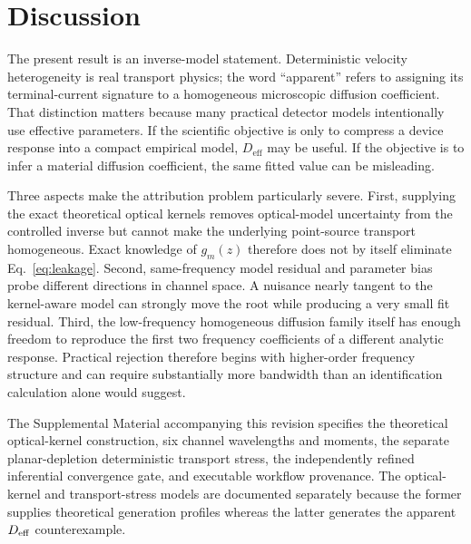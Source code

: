 \documentclass[aps,pra,twocolumn,superscriptaddress,nofootinbib]{revtex4-2}
\newcommand{\Deff}{D_{\mathrm{eff}}}
\begin{document}
\section{Discussion}

The present result is an inverse-model statement. Deterministic velocity heterogeneity is real transport physics; the word ``apparent'' refers to assigning its terminal-current signature to a homogeneous microscopic diffusion coefficient. That distinction matters because many practical detector models intentionally use effective parameters. If the scientific objective is only to compress a device response into a compact empirical model, $\Deff$ may be useful. If the objective is to infer a material diffusion coefficient, the same fitted value can be misleading.

Three aspects make the attribution problem particularly severe. First, supplying the exact theoretical optical kernels removes optical-model uncertainty from the controlled inverse but cannot make the underlying point-source transport homogeneous. Exact knowledge of $g_m(z)$ therefore does not by itself eliminate Eq.~\eqref{eq:leakage}. Second, same-frequency model residual and parameter bias probe different directions in channel space. A nuisance nearly tangent to the kernel-aware model can strongly move the root while producing a very small fit residual. Third, the low-frequency homogeneous diffusion family itself has enough freedom to reproduce the first two frequency coefficients of a different analytic response. Practical rejection therefore begins with higher-order frequency structure and can require substantially more bandwidth than an identification calculation alone would suggest.

The Supplemental Material accompanying this revision specifies the theoretical optical-kernel construction, six channel wavelengths and moments, the separate planar-depletion deterministic transport stress, the independently refined inferential convergence gate, and executable workflow provenance.  The optical-kernel and transport-stress models are documented separately because the former supplies theoretical generation profiles whereas the latter generates the apparent $D_{\rm eff}$ counterexample.
\end{document}
